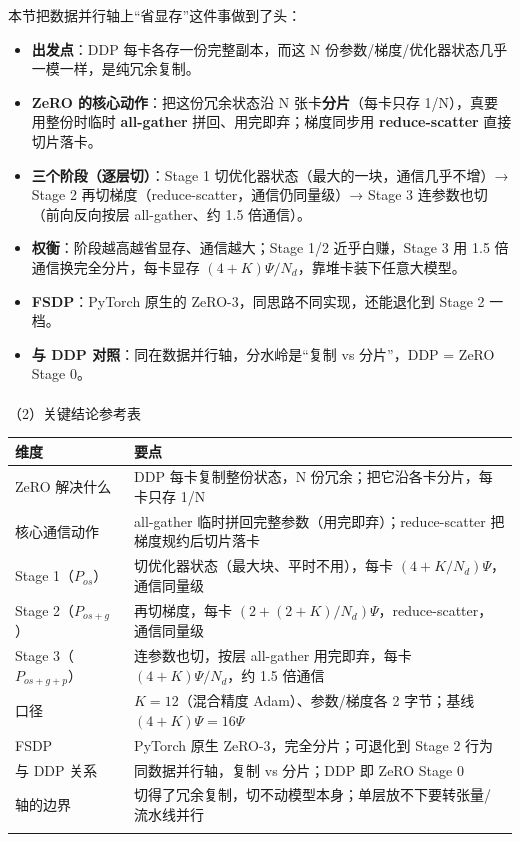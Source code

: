 \documentclass[
  chinese,
]{ctexart}
\makeatletter
\let\oldparagraph\paragraph
\renewcommand{\paragraph}{
    \@ifstar
      \xxxParagraphStar
      \xxxParagraphNoStar
  }
\newcommand{\xxxParagraphStar}[1]{\oldparagraph*{#1}\mbox{}}
\newcommand{\xxxParagraphNoStar}[1]{\oldparagraph{#1}\mbox{}}
\providecommand{\tightlist}{%
  \setlength{\itemsep}{0pt}\setlength{\parskip}{0pt}}
\makeatother
\begin{document}
本节把数据并行轴上``省显存''这件事做到了头：

\begin{itemize}
\tightlist
\item
  \textbf{出发点}：DDP 每卡各存一份完整副本，而这 N
  份参数/梯度/优化器状态几乎一模一样，是纯冗余复制。
\item
  \textbf{ZeRO 的核心动作}：把这份冗余状态沿 N
  张卡\textbf{分片}（每卡只存 1/N），真要用整份时临时
  \textbf{all-gather} 拼回、用完即弃；梯度同步用 \textbf{reduce-scatter}
  直接切片落卡。
\item
  \textbf{三个阶段（逐层切）}：Stage 1
  切优化器状态（最大的一块，通信几乎不增）→ Stage 2
  再切梯度（reduce-scatter，通信仍同量级）→ Stage 3
  连参数也切（前向反向按层 all-gather、约 1.5 倍通信）。
\item
  \textbf{权衡}：阶段越高越省显存、通信越大；Stage 1/2 近乎白赚，Stage 3
  用 1.5 倍通信换完全分片，每卡显存
  \((4+K)\Psi/N_d\)，靠堆卡装下任意大模型。
\item
  \textbf{FSDP}：PyTorch 原生的 ZeRO-3，同思路不同实现，还能退化到 Stage
  2 一档。
\item
  \textbf{与 DDP 对照}：同在数据并行轴，分水岭是``复制 vs 分片''，DDP =
  ZeRO Stage 0。
\end{itemize}

\paragraph{（2）关键结论参考表}\label{ux5173ux952eux7ed3ux8bbaux53c2ux8003ux8868-2}

\begin{center}
\begin{tabular}{@{}>{\raggedright\arraybackslash}p{} >{\raggedright\arraybackslash}p{}@{}}
\toprule\noalign{}
维度 & 要点 \\
\midrule\noalign{}
ZeRO 解决什么 & DDP 每卡复制整份状态，N 份冗余；把它沿各卡分片，每卡只存 1/N \\
核心通信动作 & all-gather 临时拼回完整参数（用完即弃）；reduce-scatter 把梯度规约后切片落卡 \\
Stage 1（\(P_{os}\)） & 切优化器状态（最大块、平时不用），每卡 \((4+K/N_d)\Psi\)，通信同量级 \\
Stage 2（\(P_{os+g}\)） & 再切梯度，每卡 \((2+(2+K)/N_d)\Psi\)，reduce-scatter，通信同量级 \\
Stage 3（\(P_{os+g+p}\)） & 连参数也切，按层 all-gather 用完即弃，每卡 \((4+K)\Psi/N_d\)，约 1.5 倍通信 \\
口径 & \(K{=}12\)（混合精度 Adam）、参数/梯度各 2 字节；基线 \((4+K)\Psi=16\Psi\) \\
FSDP & PyTorch 原生 ZeRO-3，完全分片；可退化到 Stage 2 行为 \\
与 DDP 关系 & 同数据并行轴，复制 vs 分片；DDP 即 ZeRO Stage 0 \\
轴的边界 & 切得了冗余复制，切不动模型本身；单层放不下要转张量/流水线并行 \\
\bottomrule\noalign{}
\end{tabular}
\end{center}
\end{document}

